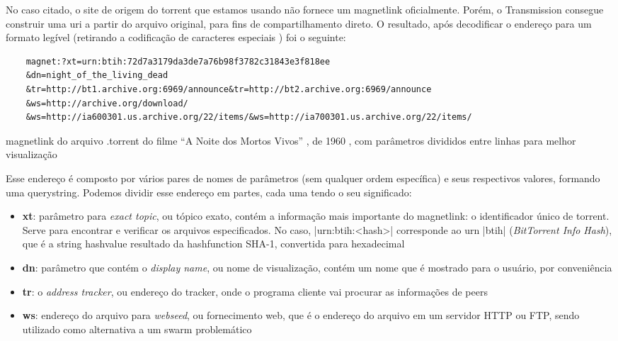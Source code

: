 No caso citado, o site de origem do \gls*{torrent} que estamos usando não fornece um
\gls*{magnetlink} oficialmente. Porém, o Transmission consegue construir uma \gls*{uri}
a partir do arquivo original, para fins de compartilhamento direto. O resultado, após
decodificar o endereço para um formato legível (retirando a codificação de caracteres
especiais \cite{wiki:urlencode}) foi o seguinte:

\begin{listing}[ht!]
    \begin{verbatim}
    magnet:?xt=urn:btih:72d7a3179da3de7a76b98f3782c31843e3f818ee
    &dn=night_of_the_living_dead
    &tr=http://bt1.archive.org:6969/announce&tr=http://bt2.archive.org:6969/announce
    &ws=http://archive.org/download/
    &ws=http://ia600301.us.archive.org/22/items/&ws=http://ia700301.us.archive.org/22/items/
    \end{verbatim}
    \caption{\gls*{magnetlink} do arquivo .torrent do filme ``A Noite dos Mortos Vivos''
    , de 1960 \cite{torrent-file}, com parâmetros divididos entre linhas para melhor
    visualização}
    \label{lst:torrent-file-magnet-link}
\end{listing}

Esse endereço é composto por vários pares de nomes de parâmetros (sem qualquer ordem
específica) e seus respectivos valores, formando uma \gls{querystring}. Podemos
dividir esse endereço em partes, cada uma tendo o seu significado:

\begin{itemize}
    \item \textbf{xt}: parâmetro para \emph{exact topic}, ou tópico exato, contém a
        informação mais importante do \gls*{magnetlink}: o identificador único de
        \gls*{torrent}. Serve para encontrar e verificar os arquivos especificados.
        No caso, \bverb|urn:btih:<hash>| corresponde ao \gls{urn} \sverb|btih|
        (\emph{BitTorrent Info Hash}), que é a \gls*{string} \gls{hashvalue} resultado
        da \gls{hashfunction} SHA-1, convertida para hexadecimal

    \item \textbf{dn}: parâmetro que contém o \emph{display name}, ou nome de
        visualização, contém um nome que é mostrado para o usuário, por conveniência

    \item \textbf{tr}: o \emph{address tracker}, ou endereço do \gls*{tracker}, onde o
        programa cliente vai procurar as informações de \glspl*{peer}

    \item \textbf{ws}: endereço do arquivo para \emph{webseed}, ou fornecimento web,
        que é o endereço do arquivo em um servidor HTTP ou FTP, sendo utilizado como
        alternativa a um \gls*{swarm} problemático \cite{wiki:torrent}
\end{itemize}

